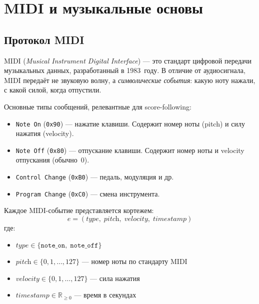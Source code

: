 \documentclass[a4paper,11pt]{article}
\newcommand{\hlblue}[1]{\colorbox{pastelblue!25}{#1}}
\begin{document}
\section{MIDI и музыкальные основы}
\label{sec:midi}

\subsection{Протокол MIDI}

MIDI (\emph{Musical Instrument Digital Interface}) --- это стандарт цифровой
передачи музыкальных данных, разработанный в 1983~году. В отличие от аудиосигнала,
MIDI передаёт не звуковую волну, а \emph{символические события}: какую ноту нажали,
с какой силой, когда отпустили.

Основные типы сообщений, релевантные для score-following:

\begin{itemize}[leftmargin=2em]
  \item \hlblue{\texttt{Note On} (\texttt{0x90})} --- нажатие клавиши.
        Содержит номер ноты (pitch) и силу нажатия (velocity).
  \item \hlblue{\texttt{Note Off} (\texttt{0x80})} --- отпускание клавиши.
        Содержит номер ноты и velocity отпускания (обычно~0).
  \item \texttt{Control Change} (\texttt{0xB0}) --- педаль, модуляция и др.
  \item \texttt{Program Change} (\texttt{0xC0}) --- смена инструмента.
\end{itemize}

\begin{defbox}[title={MIDI-событие}]
Каждое MIDI-событие представляется кортежем:
\[
  e = (\textit{type},\; \textit{pitch},\; \textit{velocity},\; \textit{timestamp})
\]
где:
\begin{itemize}[leftmargin=1.5em]
  \item $\textit{type} \in \{\texttt{note\_on},\; \texttt{note\_off}\}$
  \item $\textit{pitch} \in \{0, 1, \ldots, 127\}$ --- номер ноты по стандарту MIDI
  \item $\textit{velocity} \in \{0, 1, \ldots, 127\}$ --- сила нажатия
  \item $\textit{timestamp} \in \mathbb{R}_{\geq 0}$ --- время в секундах
\end{itemize}
\end{defbox}
\end{document}
